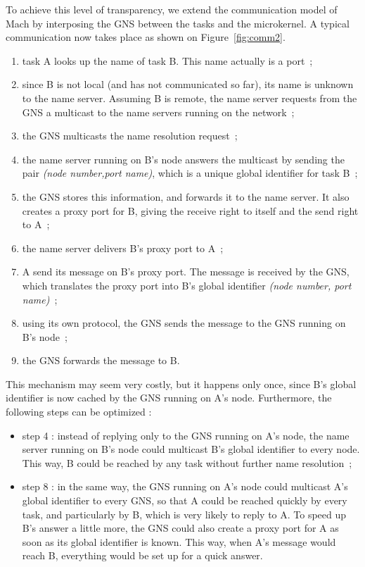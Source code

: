 To achieve this level of transparency, we extend the communication model
of Mach by interposing the GNS between the tasks and the microkernel.
A typical communication now takes place as shown on Figure~\ref{fig:comm2}.


\begin{enumerate}
\item task A looks up the name of task B. This name actually is a port~;
\item since B is not local (and has not communicated so far), its name is unknown to the name server. Assuming B is remote, the name server requests from the
GNS a multicast to the name servers running on the network~;
\item the GNS multicasts the name resolution request~; 
\item the name server running on B's node answers the multicast by sending the pair {\it (node number,port name)}, which is a unique global 
identifier for task B~;
\item the GNS stores this information, and forwards it to the name server. It also creates a proxy port for B, giving the receive right to itself and the send right to A~; 
\item the name server delivers B's proxy port to A~;
\item A send its message on B's proxy port. The message is received by the GNS, which translates the proxy port into B's global identifier {\it (node number, port name)}~;
\item using its own protocol, the GNS sends the message to the GNS running on B's node~; 
\item the GNS forwards the message to B.
\end{enumerate}

This mechanism may seem very costly, but it happens only once, since B's global
identifier is now cached by the GNS running on A's node.
Furthermore, the following steps can be optimized :
\begin{itemize}
\item step 4 : instead of replying only to the GNS running on A's node, the name server running on B's node could multicast B's global identifier to every node. This way, B could be reached by any task without further name resolution~;
\item step 8 : in the same way, the GNS running on A's node could multicast A's global identifier to every GNS, so that A could be reached quickly by every task, and particularly by B, which is very likely to reply to A. To speed up B's answer a little more, the GNS could also create a proxy port for A as soon as its global identifier is known. This way, when A's message would reach B, everything would be set up for a quick answer. 
\end{itemize}

